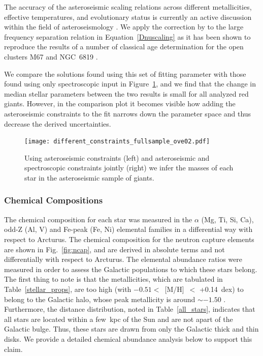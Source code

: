 \documentclass[a4paper,fleqn,usenatbib]{mnras}
\begin{document}
The accuracy of the asteroseismic scaling relations across different metallicities, effective temperatures, and evolutionary status is currently an active discussion within the field of asteroseismology \citep[see][]{white2011,belkacem2011,sharma2016,viani2017}.
We apply the correction by \cite{Serenelli:2017cn} to the large frequency separation relation in Equation~\ref{Dnuscaling} as it has been shown to reproduce the results of a number of classical age determination for the open clusters M67 \citep{stello2016} and NGC~6819 \citep{casagrande2016}.

We compare the solutions found using this set of fitting parameter with those found using only spectroscopic input in Figure~\ref{masses}, and we find that the change in median stellar parameters between the two results is small for all analyzed red giants. However, in the comparison plot it becomes visible how adding the asteroseismic constraints to the fit narrows down the parameter space and thus decrease the derived uncertainties.


\begin{figure}
\noindent\texttt{[image: different\_constraints\_fullsample\_ove02.pdf]}

\caption{\label{masses}
Using asteroseismic constraints (left) and asteroseismic and spectroscopic constraints jointly (right) we infer the masses of each star in the asteroseismic sample of giants.}
\end{figure}



\subsubsection{Chemical Compositions}
\label{chemical}
The chemical composition for each star was measured in the $\alpha$ (Mg, Ti, Si, Ca), odd-Z (Al, V) and Fe-peak (Fe, Ni) elemental families in a differential way with respect to Arcturus. The chemical composition for the neutron capture elements are shown in Fig.~\ref{fig:ncap}, and are derived in absolute terms and not differentially with respect to Arcturus. The elemental abundance ratios were measured in order to assess the Galactic populations to which these stars belong. The first thing to note is that the metallicities, which are tabulated in Table~\ref{stellar_props}, are too high (with $-0.51<$~[M/H]~$<$ +0.14~dex) to belong to the Galactic halo, whose peak metallicity is around $\sim -1.50$ \cite[e.g.][]{Chiba2000}. Furthermore, the distance distribution, noted in Table~\ref{all_stars}, indicates that all stars are located within a few~kpc of the Sun and are not apart of the Galactic bulge. Thus, these stars are drawn from only the Galactic thick and thin disks. We provide a detailed chemical abundance analysis below to support this claim.\\
\end{document}

